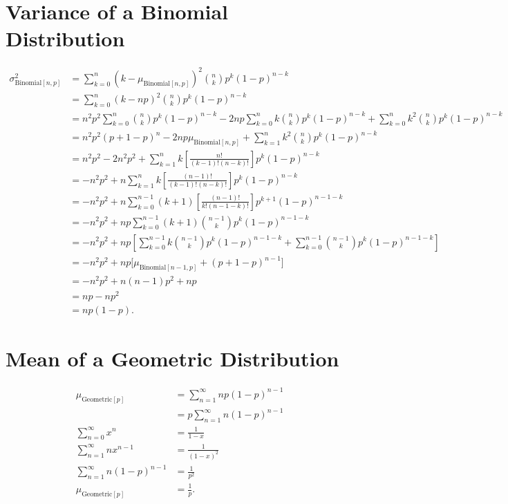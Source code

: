 \documentclass{myart}
\newcommand{\mean}{\mu}
\newcommand{\variance}{\sigma^2}
\newcommand{\sub}[1]{_{\text{#1}}}
\begin{document}
\section{Variance of a Binomial Distribution}

\begin{align*}
\variance\sub{Binomial$[n,p]$} &= \sum_{k=0}^n (k - \mean\sub{Binomial$[n,p]$})^2 \binom{n}{k} p^k (1-p)^{n-k} \\
&= \sum_{k=0}^n (k - n p)^2 \binom{n}{k} p^k (1-p)^{n-k} \\
&= n^2 p^2 \sum_{k=0}^n \binom{n}{k} p^k (1-p)^{n-k} - 2n p \sum_{k=0}^n k \binom{n}{k} p^k (1-p)^{n-k} + \sum_{k=0}^n k^2 \binom{n}{k} p^k (1-p)^{n-k} \\
&= n^2 p^2 (p + 1 - p)^n - 2n p \mean\sub{Binomial$[n,p]$} + \sum_{k=1}^n k^2 \binom{n}{k} p^k (1-p)^{n-k} \\
&= n^2 p^2 - 2n^2 p^2 + \sum_{k=1}^n k \left[\frac{n!}{(k-1)!(n-k)!}\right] p^k (1-p)^{n-k} \\
&= -n^2 p^2 + n \sum_{k=1}^n k \left[\frac{(n-1)!}{(k-1)! (n-k)!}\right] p^k (1-p)^{n-k} \\
&= -n^2 p^2 + n \sum_{k=0}^{n-1} (k+1) \left[\frac{(n-1)!}{k! (n-1-k)!}\right] p^{k+1} (1-p)^{n-1-k} \\
&= -n^2 p^2 + n p \sum_{k=0}^{n-1} (k+1) \binom{n-1}{k} p^k (1-p)^{n-1-k} \\
&= -n^2 p^2 + n p \left[\sum_{k=0}^{n-1} k \binom{n-1}{k} p^k (1-p)^{n-1-k} + \sum_{k=0}^{n-1} \binom{n-1}{k} p^k (1-p)^{n-1-k}\right] \\
&= -n^2 p^2 + n p \big[\mean\sub{Binomial$[n-1,p]$} + (p + 1 - p)^{n-1}\big] \\
&= -n^2 p^2 + n(n - 1) p^2 + n p \\
&= n p - n p^2 \\
&= n p (1 - p).
\end{align*}

\section{Mean of a Geometric Distribution}

\begin{align*}
\mean\sub{Geometric$[p]$} &= \sum_{n=1}^\infty n p (1-p)^{n-1} \\
&= p \sum_{n=1}^\infty n (1-p)^{n-1} \\
\sum_{n=0}^\infty x^n &= \frac{1}{1-x} \\
\sum_{n=1}^\infty n x^{n-1} &= \frac{1}{(1-x)^2} \\
\sum_{n=1}^\infty n (1-p)^{n-1} &= \frac{1}{p^2} \\
\mean\sub{Geometric$[p]$} &= \frac{1}{p}.
\end{align*}
\end{document}
